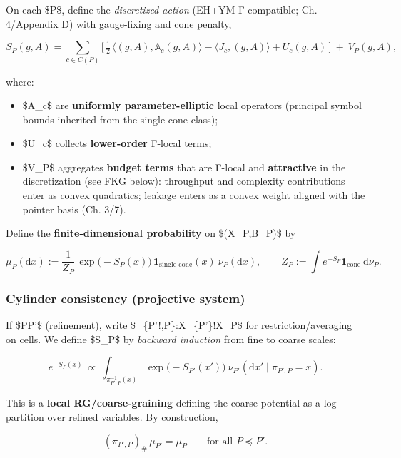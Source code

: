 \documentclass[
]{article}
\providecommand{\tightlist}{%
  \setlength{\itemsep}{0pt}\setlength{\parskip}{0pt}}
\numberwithin{equation}{section}
\begin{document}
On each \$P\$, define the \emph{discretized action} (EH+YM Γ-compatible;
Ch. 4/Appendix D) with gauge-fixing and cone penalty,

\[
S_P(g,A)=\sum_{c\in C(P)} \Big[\,\tfrac12\,\langle (g,A),\mathbb A_c (g,A)\rangle - \langle J_c,(g,A)\rangle + U_c(g,A)\,\Big]\ +\ V_P(g,A),
\]

where:

\begin{itemize}
\tightlist
\item
  \$\mathbb A\_c\$ are \textbf{uniformly parameter-elliptic} local
  operators (principal symbol bounds inherited from the single-cone
  class);
\item
  \$U\_c\$ collects \textbf{lower-order} Γ-local terms;
\item
  \$V\_P\$ aggregates \textbf{budget terms} that are Γ-local and
  \textbf{attractive} in the discretization (see FKG below): throughput
  and complexity contributions enter as convex quadratics; leakage
  enters as a convex weight aligned with the pointer basis (Ch. 3/7).
\end{itemize}

Define the \textbf{finite-dimensional probability} on
\$(\mathcal X\_P,\mathcal B\_P)\$ by

\[
\mu_P(\mathrm d x):=\frac{1}{Z_P}\,\exp\!\big(\!-S_P(x)\big)\,\mathbf 1_{\text{single-cone}}(x)\ \nu_P(\mathrm d x),\qquad Z_P:=\int e^{-S_P}\mathbf 1_{\text{cone}}\ \mathrm d\nu_P.
\tag{9.3}
\]

\hypertarget{cylinder-consistency-projective-system}{%
\subsubsection{Cylinder consistency (projective
system)}\label{cylinder-consistency-projective-system}}

If \$P\preceq P'\$ (refinement), write
\$\pi\_\{P'!,P\}:\mathcal X\_\{P'\}!\to\mathcal X\_P\$ for
restriction/averaging on cells. We define \$S\_P\$ by \emph{backward
induction} from fine to coarse scales:

\[
e^{-S_P(x)}\ \propto\ \int_{\pi_{P'\!,P}^{-1}(x)}\!\exp\!\big(\!-S_{P'}(x')\big)\ \nu_{P'}(\mathrm d x'\mid \pi_{P'\!,P}=x).
\tag{9.4}
\]

This is a \textbf{local RG/coarse-graining} defining the coarse
potential as a log-partition over refined variables. By construction,

\[
(\pi_{P'\!,P})_\#\,\mu_{P'}=\mu_P\qquad\text{for all }P\preceq P'.
\tag{9.5}
\]
\end{document}
